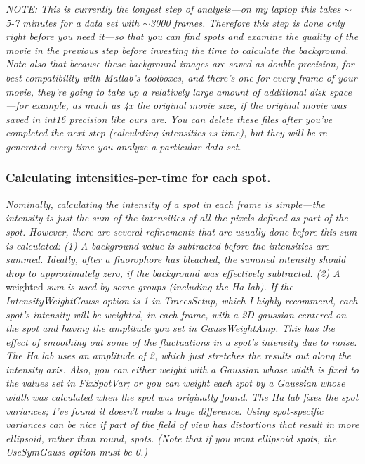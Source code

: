 \documentclass[11pt]{article}
\begin{document}
{\it NOTE: This is currently the longest step of analysis---on my laptop this takes $\sim$5-7 minutes for a data set with $\sim$3000 frames.  Therefore this step is done only right before you need it---so that you can find spots and examine the quality of the movie in the previous step before investing the time to calculate the background.  Note also that because these background images are saved as double precision, for best compatibility with Matlab's toolboxes, and there's one for every frame of your movie, they're going to take up a relatively large amount of additional disk space---for example, as much as 4x the original movie size, if the original movie was saved in int16 precision like ours are.  You can delete these files after you've completed the next step (calculating intensities vs time), but they will be re-generated every time you analyze a particular data set. }

\subsubsection{Calculating intensities-per-time for each spot.}

{\it Nominally, calculating the intensity of a spot in each frame is simple---the intensity is just the sum of the intensities of all the pixels defined as part of the spot. However, there are several refinements that are usually done before this sum is calculated: (1) A background value is subtracted before the intensities are summed.  Ideally, after a fluorophore has bleached, the summed intensity should drop to approximately zero, if the background was effectively subtracted. (2) A} weighted {\it sum is used by some groups (including the Ha lab). If the IntensityWeightGauss option is 1 in TracesSetup, which I highly recommend, each spot's intensity will be weighted, in each frame, with a 2D gaussian centered on the spot and having the amplitude you set in GaussWeightAmp. This has the effect of smoothing out some of the fluctuations in a spot's intensity due to noise. The Ha lab uses an amplitude of 2, which just stretches the results out along the intensity axis.  Also, you can either weight with a Gaussian whose width is fixed to the values set in FixSpotVar; or you can weight each spot by a Gaussian whose width was calculated when the spot was originally found. The Ha lab fixes the spot variances; I've found it doesn't make a huge difference. Using spot-specific variances can be nice if part of the field of view has distortions that result in more ellipsoid, rather than round, spots.  (Note that if you want ellipsoid spots, the UseSymGauss option must be 0.)}\\
\end{document}
